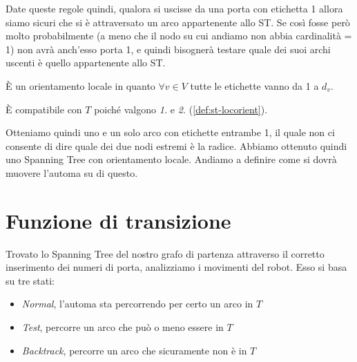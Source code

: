 Date queste regole quindi, qualora si uscisse da una porta con etichetta 1
allora siamo sicuri che si è attraversato un arco appartenente allo ST. Se così
fosse però molto probabilmente (a meno che il nodo su cui andiamo non abbia
cardinalità = 1) non avrà anch'esso porta 1, e quindi bisognerà testare quale
dei suoi archi uscenti è quello appartenente allo ST.
\newpage
{}

È un orientamento locale in quanto $\forall v \in V$ tutte le etichette vanno da
1 a $d_v$.

È compatibile con $T$ poiché valgono \textit{1.} e \textit{2.}
(\ref{def:st-locorient}).

Otteniamo quindi uno e un solo arco con etichette entrambe 1, il quale non ci
consente di dire quale dei due nodi estremi è la radice. Abbiamo ottenuto quindi
uno Spanning Tree con orientamento locale. Andiamo a definire come si dovrà
muovere l'automa su di questo.

\section{Funzione di transizione}
Trovato lo Spanning Tree del nostro grafo di partenza attraverso il corretto
inserimento dei numeri di porta, analizziamo i movimenti del robot. Esso si basa
su tre stati:
\begin{itemize}
    \item \textit{Normal}, l'automa sta percorrendo per certo un arco in $T$
    \item \textit{Test}, percorre un arco che può o meno essere in $T$
    \item \textit{Backtrack}, percorre un arco che sicuramente non è in $T$
\end{itemize}

